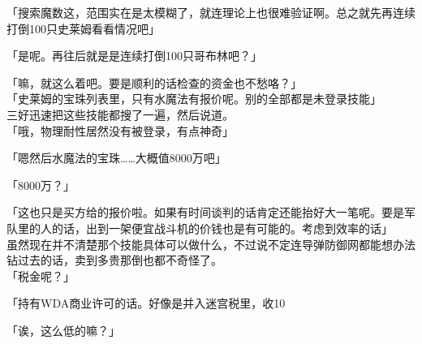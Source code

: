 「搜索魔数这，范围实在是太模糊了，就连理论上也很难验证啊。总之就先再连续打倒100只史莱姆看看情况吧」

「是呢。再往后就是是连续打倒100只哥布林吧？」

「嘛，就这么着吧。要是顺利的话检查的资金也不愁咯？」\\

「史莱姆的宝珠列表里，只有水魔法有报价呢。别的全部都是未登录技能」\\

三好迅速把这些技能都搜了一遍，然后说道。\\

「哦，物理耐性居然没有被登录，有点神奇」

「嗯然后水魔法的宝珠……大概值8000万吧」

「8000万？」

「这也只是买方给的报价啦。如果有时间谈判的话肯定还能抬好大一笔呢。要是军队里的人的话，出到一架便宜战斗机的价钱也是有可能的。考虑到效率的话」\\

虽然现在并不清楚那个技能具体可以做什么，不过说不定连导弹防御网都能想办法钻过去的话，卖到多贵那倒也都不奇怪了。\\

「税金呢？」

「持有WDA商业许可的话。好像是并入迷宫税里，收10%

「诶，这么低的嘛？」

